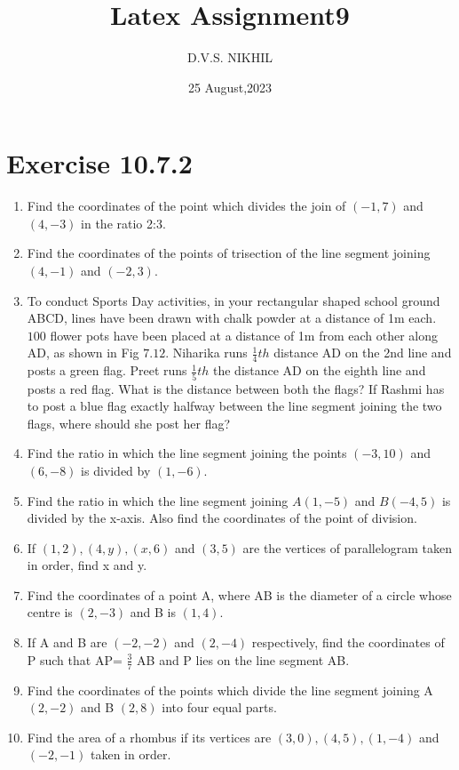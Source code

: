 \documentclass{article}
\theoremstyle{remark}
\begin{document}
\title{Latex Assignment9}
\author{D.V.S. NIKHIL}
\date{25 August,2023}
\maketitle
\section*{Exercise 10.7.2}
\begin{enumerate}
\item Find the coordinates of the point which divides the join of $(-1,7)$ and $(4,-3)$ in the ratio 2:3.
\item Find the coordinates of the points of trisection of the line segment joining $(4,-1)$ and $(-2,3)$.
\item To conduct Sports Day activities, in your rectangular shaped school ground ABCD, lines have been drawn with chalk powder at a distance of 1m each. $100$ flower pots have been placed at a distance of 1m from each other along AD, as shown in Fig $7.12$. Niharika runs $\frac {1}{4}th$ distance AD on the 2nd line and posts a green flag. Preet runs $\frac {1}{5}th$ the distance AD on the eighth line and posts a red flag. What is the distance between both the flags? If Rashmi has to post a blue flag exactly halfway between the line segment joining the two flags, where should she post her flag?
\item Find the ratio in which the line segment joining the points $(-3,10)$ and $(6,-8)$ is divided by $(1,-6)$.
\item Find the ratio in which the line segment joining $A(1,-5)$ and $B(-4,5)$ is divided by the x-axis. Also find the coordinates of the point of division.
\item If $(1,2), (4,y), (x,6)$ and $(3,5)$ are the vertices of parallelogram taken in order, find x and y.
\item Find the coordinates of a point A, where AB is the diameter of a circle whose centre is $(2,-3)$ and B is $(1,4)$.
\item If A and B are $(-2,-2)$ and $(2,-4)$ respectively, find the coordinates of P such that AP= $\frac {3}{7}$ AB  and P lies on the line segment AB.
\item Find the coordinates of the points which divide the line segment joining A $(2,-2)$ and B $(2,8)$ into four equal parts.
\item Find the area of a rhombus if its vertices are $(3,0), (4,5), (1,-4)$ and $(-2,-1)$ taken in order.
\end{enumerate}
\end{document}
